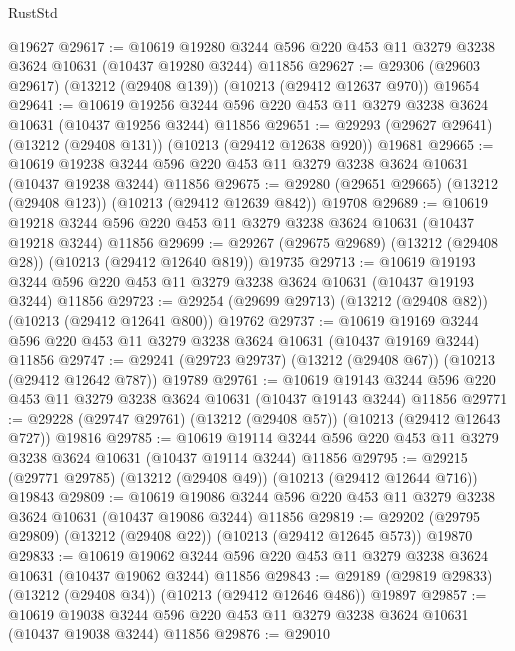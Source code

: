 \begin{lexlean}{RustStd}
\begin{coremodule}
{\begin{coremodule}
{{{{{{{{{{{{{{{{{{{{{{{{{{    @19627
@29617 := @10619
    @19280
    @3244
    @596
    @220
    @453
    @11
    @3279
    @3238
    @3624
    @10631
    (@10437 @19280 @3244)
    @11856
@29627 := @29306 (@29603 @29617) (@13212 (@29408 @139)) (@10213 (@29412 @12637 @970)) @19654
@29641 := @10619
    @19256
    @3244
    @596
    @220
    @453
    @11
    @3279
    @3238
    @3624
    @10631
    (@10437 @19256 @3244)
    @11856
@29651 := @29293 (@29627 @29641) (@13212 (@29408 @131)) (@10213 (@29412 @12638 @920)) @19681
@29665 := @10619
    @19238
    @3244
    @596
    @220
    @453
    @11
    @3279
    @3238
    @3624
    @10631
    (@10437 @19238 @3244)
    @11856
@29675 := @29280 (@29651 @29665) (@13212 (@29408 @123)) (@10213 (@29412 @12639 @842)) @19708
@29689 := @10619
    @19218
    @3244
    @596
    @220
    @453
    @11
    @3279
    @3238
    @3624
    @10631
    (@10437 @19218 @3244)
    @11856
@29699 := @29267 (@29675 @29689) (@13212 (@29408 @28)) (@10213 (@29412 @12640 @819)) @19735
@29713 := @10619
    @19193
    @3244
    @596
    @220
    @453
    @11
    @3279
    @3238
    @3624
    @10631
    (@10437 @19193 @3244)
    @11856
@29723 := @29254 (@29699 @29713) (@13212 (@29408 @82)) (@10213 (@29412 @12641 @800)) @19762
@29737 := @10619
    @19169
    @3244
    @596
    @220
    @453
    @11
    @3279
    @3238
    @3624
    @10631
    (@10437 @19169 @3244)
    @11856
@29747 := @29241 (@29723 @29737) (@13212 (@29408 @67)) (@10213 (@29412 @12642 @787)) @19789
@29761 := @10619
    @19143
    @3244
    @596
    @220
    @453
    @11
    @3279
    @3238
    @3624
    @10631
    (@10437 @19143 @3244)
    @11856
@29771 := @29228 (@29747 @29761) (@13212 (@29408 @57)) (@10213 (@29412 @12643 @727)) @19816
@29785 := @10619
    @19114
    @3244
    @596
    @220
    @453
    @11
    @3279
    @3238
    @3624
    @10631
    (@10437 @19114 @3244)
    @11856
@29795 := @29215 (@29771 @29785) (@13212 (@29408 @49)) (@10213 (@29412 @12644 @716)) @19843
@29809 := @10619
    @19086
    @3244
    @596
    @220
    @453
    @11
    @3279
    @3238
    @3624
    @10631
    (@10437 @19086 @3244)
    @11856
@29819 := @29202 (@29795 @29809) (@13212 (@29408 @22)) (@10213 (@29412 @12645 @573)) @19870
@29833 := @10619
    @19062
    @3244
    @596
    @220
    @453
    @11
    @3279
    @3238
    @3624
    @10631
    (@10437 @19062 @3244)
    @11856
@29843 := @29189 (@29819 @29833) (@13212 (@29408 @34)) (@10213 (@29412 @12646 @486)) @19897
@29857 := @10619
    @19038
    @3244
    @596
    @220
    @453
    @11
    @3279
    @3238
    @3624
    @10631
    (@10437 @19038 @3244)
    @11856
@29876 := @29010
}}}}}}}}}}}}}}}}}}}}}}}}}}
\end{coremodule}}
\end{coremodule}
\end{lexlean}

